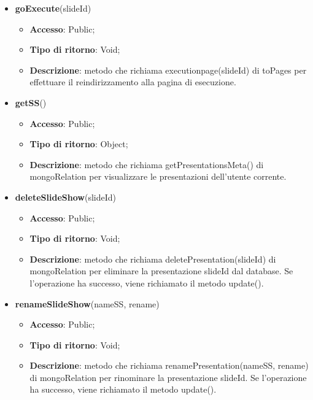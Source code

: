 {{\begin{itemize}
			\begin{itemize}
				\item \textbf{Accesso}: Public;
				\item \textbf{Tipo di ritorno}: Void;
				\item \textbf{Descrizione}: metodo che richiama edipage(slideId) di toPages per effettuare il reindirizzamento alla pagina di edit.
			\end{itemize}
			\item \textbf{goExecute}(slideId)
			\begin{itemize}
				\item \textbf{Accesso}: Public;
				\item \textbf{Tipo di ritorno}: Void;
				\item \textbf{Descrizione}: metodo che richiama executionpage(slideId) di toPages per effettuare il reindirizzamento alla pagina di esecuzione.
			\end{itemize}
			\item \textbf{getSS}()
			\begin{itemize}
				\item \textbf{Accesso}: Public;
				\item \textbf{Tipo di ritorno}: Object;
				\item \textbf{Descrizione}: metodo che richiama getPresentationsMeta() di mongoRelation per visualizzare le presentazioni dell'utente corrente.
			\end{itemize}
			\item \textbf{deleteSlideShow}(slideId)
			\begin{itemize}
				\item \textbf{Accesso}: Public;
				\item \textbf{Tipo di ritorno}: Void;
				\item \textbf{Descrizione}: metodo che richiama deletePresentation(slideId) di mongoRelation per eliminare la presentazione slideId dal database. Se l'operazione ha successo, viene richiamato il metodo update().
			\end{itemize}
			\item \textbf{renameSlideShow}(nameSS, rename)
			\begin{itemize}
				\item \textbf{Accesso}: Public;
				\item \textbf{Tipo di ritorno}: Void;
				\item \textbf{Descrizione}: metodo che richiama renamePresentation(nameSS, rename) di mongoRelation per rinominare la presentazione slideId. Se l'operazione ha successo, viene richiamato il metodo update().

\end{itemize}
\end{itemize}}}
